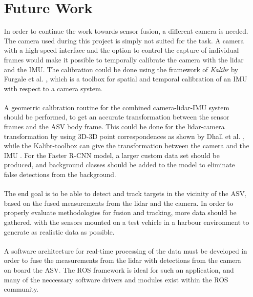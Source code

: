 \section{Future Work}
In order to continue the work towards sensor fusion, a different camera is needed. The camera used during this project is simply not suited for the task. A camera with a high-speed interface and the option to control the capture of individual frames would make it possible to temporally calibrate the camera with the lidar and the IMU. The calibration could be done using the framework of \textit{Kalibr} by Furgale et al. \cite{furgale_iros13}, which is a toolbox for spatial and temporal calibration of an IMU with respect to a camera system.\\\vspace{1mm}\\
A geometric calibration routine for the combined camera-lidar-IMU system should be performed, to get an accurate transformation between the sensor frames and the ASV body frame. This could be done for the lidar-camera transformation by using 3D-3D point correspondences as shown by Dhall et al. \cite{DBLP:journals/corr/DhallCRK17}, while the Kalibr-toolbox can give the transformation between the camera and the IMU \cite{furgale_iros13}. For the Faster R-CNN model, a larger custom data set should be produced, and background classes should be added to the model to eliminate false detections from the background.\\\vspace{1mm}\\
The end goal is to be able to detect and track targets in the vicinity of the ASV, based on the fused measurements from the lidar and the camera. In order to properly evaluate methodologies for fusion and tracking, more data should be gathered, with the sensors mounted on a test vehicle in a harbour environment to generate as realistic data as possible.\\\vspace{1mm}\\
A software architecture for real-time processing of the data must be developed in order to fuse the measurements from the lidar with detections from the camera on board the ASV. The ROS framework is ideal for such an application, and many of the neccessary software drivers and modules exist within the ROS community.
\cleardoublepage